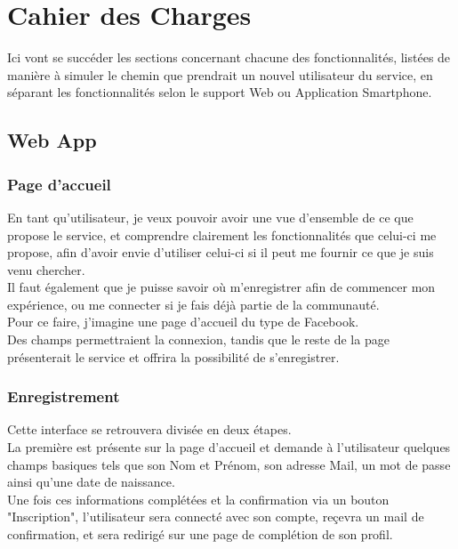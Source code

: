 \documentclass[a4paper,10pt,final,fleqn]{article}
\begin{document}
	\section{Cahier des Charges}

		Ici vont se succéder les sections concernant chacune des fonctionnalités, listées de manière à simuler le chemin que prendrait un nouvel utilisateur du service, en séparant les fonctionnalités selon le support Web ou Application Smartphone.\\

		\subsection{Web App}

			\subsubsection{Page d'accueil}

				En tant qu'utilisateur, je veux pouvoir avoir une vue d'ensemble de ce que propose le service, et comprendre clairement les fonctionnalités que celui-ci me propose, afin d'avoir envie d'utiliser celui-ci si il peut me fournir ce que je suis venu chercher.\\
				Il faut également que je puisse savoir où m'enregistrer afin de commencer mon expérience, ou me connecter si je fais déjà partie de la communauté.\\

				Pour ce faire, j'imagine une page d'accueil du type de Facebook.\\
				Des champs permettraient la connexion, tandis que le reste de la page présenterait le service et offrira la possibilité de s'enregistrer.\\

			\subsubsection{Enregistrement}

				Cette interface se retrouvera divisée en deux étapes.\\

				La première est présente sur la page d'accueil et demande à l'utilisateur quelques champs basiques tels que son Nom et Prénom, son adresse Mail, un mot de passe ainsi qu'une date de naissance.\\
				Une fois ces informations complétées et la confirmation via un bouton "Inscription", l'utilisateur sera connecté avec son compte, reçevra un mail de confirmation, et sera redirigé sur une page de complétion de son profil.\\
\end{document}
